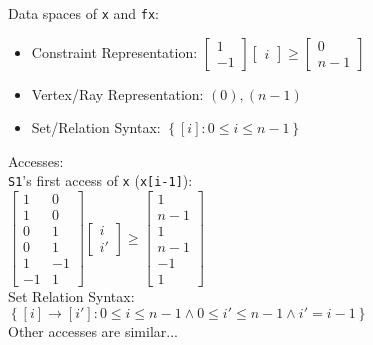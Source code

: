 \documentclass[t,handout]{beamer}
\begin{document}
\begin{frame}
Data spaces of \texttt{x} and \texttt{fx}:
\bigskip{}
\begin{itemize}
\item Constraint Representation:
$\left[\begin{array}{c}
1\\
-1\end{array}\right]\left[\begin{array}{c}
i\end{array}\right]\ge\left[\begin{array}{c}
0\\
n-1\end{array}\right]$
\bigskip{}
\item Vertex/Ray Representation: $(0),(n-1)$
\bigskip{}
\item Set/Relation Syntax: $\left\{ \left[i\right]:0\le i\le n-1\right\} $
\end{itemize}
\end{frame}

\begin{frame}
Accesses: \\
\bigskip{}
\texttt{S1}'s first access of \texttt{x} (\texttt{x[i-1]}): \\
\bigskip{}
$\left[\begin{array}{cc}
1 & 0\\
1 & 0\\
0 & 1\\
0 & 1\\
1 & -1\\
-1 & 1\end{array}\right]\left[\begin{array}{c}
i\\
i'\end{array}\right]\ge\left[\begin{array}{c}
1\\
n-1\\
1\\
n-1\\
-1\\
1\end{array}\right]$ \\
\bigskip{}
Set Relation Syntax: \\
\bigskip{}
$\left\{ \left[i\right]\rightarrow \left[i'\right]:0\le i\le n-1 \wedge 0\le i'\le n-1 \wedge i'=i-1\right\} $ \\
\bigskip{}
Other accesses are similar...
\end{frame}
\end{document}
